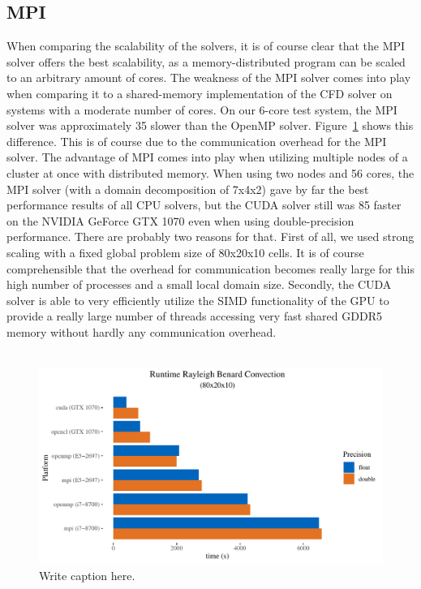 \documentclass{article}%
\begin{document}
\subsection{MPI}
When comparing the scalability of the solvers, it is of course clear that the MPI solver offers the best scalability, as a memory-distributed program can be scaled to an arbitrary amount of cores. The weakness of the MPI solver comes into play when comparing it to a shared-memory implementation of the CFD solver on systems with a moderate number of cores. On our 6-core test system, the MPI solver was approximately 35\text{\%} slower than the OpenMP solver. Figure~\ref{fig:platforms} shows this difference. This is of course due to the communication overhead for the MPI solver. The advantage of MPI comes into play when utilizing multiple nodes of a cluster at once with distributed memory.
When using two nodes and 56 cores, the MPI solver (with a domain decomposition of 7x4x2) gave by far the best performance results of all CPU solvers, but the CUDA solver still was 85\text{\%} faster on the NVIDIA GeForce GTX 1070 even when using double-precision performance. There are probably two reasons for that. First of all, we used strong scaling with a fixed global problem size of 80x20x10 cells. It is of course comprehensible that the overhead for communication becomes really large for this high number of processes and a small local domain size. Secondly, the CUDA solver is able to very efficiently utilize the SIMD functionality of the GPU to provide a really large number of threads accessing very fast shared GDDR5 memory without hardly any communication overhead.\\
\\

\begin{figure}[htb]
\centering
\includegraphics[width=1\linewidth]{../tests/graphs/runtime_rayleigh_benard_convection_8-2-1_platforms.pdf}
\caption{Write caption here.}
\label{fig:platforms}
\end{figure}
\end{document}
